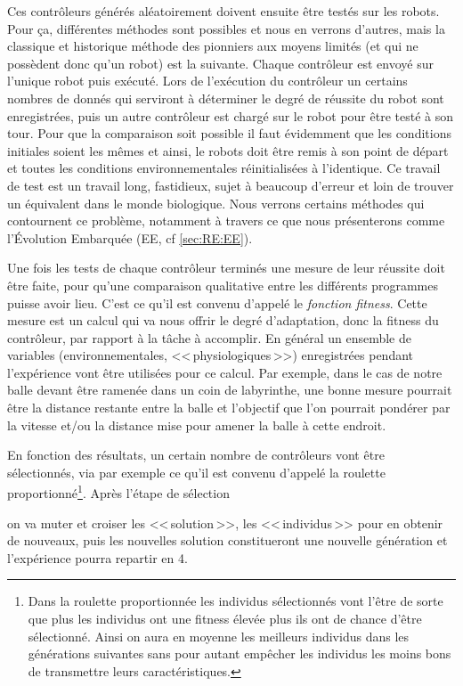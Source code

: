 \begin{inparaenum}[(\itshape 1\upshape)]
\item Ces contrôleurs générés aléatoirement doivent ensuite être testés sur les robots. Pour ça, différentes méthodes sont possibles et nous en verrons d'autres, mais la classique et historique méthode des pionniers aux moyens limités (et qui ne possèdent donc qu'un robot) est la suivante. Chaque contrôleur est envoyé sur l'unique robot puis exécuté. Lors de l'exécution du contrôleur un certains nombres de donnés qui serviront à déterminer le degré de réussite du robot sont enregistrées, puis un autre contrôleur est chargé sur le robot pour être testé à son tour. Pour que la comparaison soit possible il faut évidemment que les conditions initiales soient les mêmes et ainsi, le robots doit être remis à son point de départ et toutes les conditions environnementales réinitialisées à l'identique. Ce travail de test est un travail long, fastidieux, sujet à beaucoup d'erreur et loin de trouver un équivalent dans le monde biologique. Nous verrons certains méthodes qui contournent ce problème, notamment à travers ce que nous présenterons comme l'Évolution Embarquée (EE, cf \ref{sec:RE:EE}). \label{it:test}

\item Une fois les tests de chaque contrôleur terminés une mesure de leur réussite doit être faite, pour qu'une comparaison qualitative entre les différents programmes puisse avoir lieu. C'est ce qu'il est convenu d'appelé le \emph{fonction fitness}.  Cette mesure est un calcul qui va nous offrir le degré d'adaptation, donc la fitness du contrôleur, par rapport à la tâche à accomplir. En général un ensemble de variables (environnementales, <<\,physiologiques\,>>) enregistrées pendant l'expérience vont être utilisées pour ce calcul. Par exemple, dans le cas de notre balle devant être ramenée dans un coin de labyrinthe, une bonne mesure pourrait être la distance restante entre la balle et l'objectif que l'on pourrait pondérer par la vitesse et/ou la distance mise pour amener la balle à cette endroit.
\item En fonction des résultats, un certain nombre de contrôleurs vont être sélectionnés, via par exemple ce qu'il est convenu d'appelé la roulette proportionné\footnote{Dans la roulette proportionnée les individus sélectionnés vont l'être de sorte que plus les individus ont une fitness élevée plus ils ont de chance d'être sélectionné. Ainsi on aura en moyenne les meilleurs individus dans les générations suivantes sans pour autant empêcher les individus les moins bons de transmettre leurs caractéristiques.}. Après l'étape de sélection \item on va muter et croiser les <<\,solution\,>>, les <<\,individus\,>> pour en obtenir de nouveaux, puis les nouvelles solution constitueront une nouvelle génération et l'expérience pourra repartir en 4.
\end{inparaenum}


